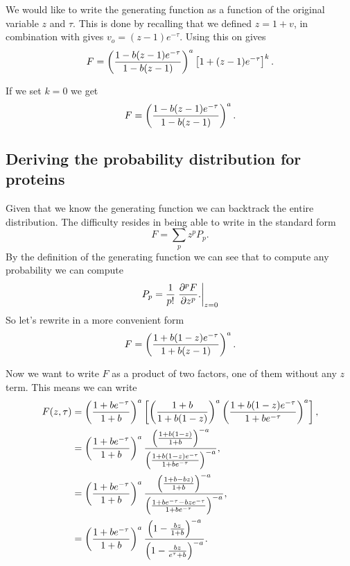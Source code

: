 We would like to write the generating function as a function of the original
variable $z$ and $\tau$. This is done by recalling that we defined $z = 1 + v$,
in combination with  gives $v_o = (z - 1) e^{-\tau}$.
Using this on  gives
\begin{equation}
  F = \left( {1 - b (z - 1) e^{-\tau}
  \over
  1 - b (z - 1)
  } \right)^a
  \left[ 1 + (z - 1) e^{-\tau} \right]^k.
\end{equation}

If we set $k = 0$ we get
\begin{equation}
  F = \left( {1 - b (z - 1) e^{-\tau}
  \over
  1 - b (z - 1)
  } \right)^a.
  \label{eq_generating_function_onz}
\end{equation}

\subsection{Deriving the probability distribution for proteins}

Given that we know the generating function we can backtrack the entire
distribution. The difficulty resides in being able to write
 in the standard form
\begin{equation}
  F = \sum_{p} z^p P_p.
\end{equation}
By the definition of the generating function we can see that to compute any
probability we can compute
\begin{equation}
  P_p = {1 \over p!} \left. {\partial ^p F \over \partial z^p}.
  \right\rvert_{z=0}
  \label{eq_prob_from_generating}
\end{equation}
So let's rewrite  in a more convenient form
\begin{equation}
  F = \left( {1 + b (1 - z) e^{-\tau}
  \over
  1 + b (z - 1)
  }  \right)^a.
\end{equation}

Now we want to write $F$ as a product of two factors, one of them without any
$z$ term. This means we can write
\begin{align}
  F(z, \tau) &= \left( {1 + b e^{-\tau} \over 1 + b } \right)^a
  \left[
  \left( {1 + b} \over 1 + b (1 - z) \right)^a
  \left( {1 + b (1 - z) e^{-\tau} \over 1 + b e^{-\tau}}  \right)^a
  \right], \\
  &= \left( {1 + b e^{-\tau} \over 1 + b } \right)^a
  { \left( {1 + b (1 - z) \over 1 + b} \right)^{-a}
  \over
  \left( {1 + b (1 - z) e^{-\tau} \over 1 + b e^{-\tau}} \right)^{-a}
  }, \\
  &= \left( {1 + b e^{-\tau} \over 1 + b } \right)^a
  { \left( {1 + b - b z) \over 1 + b} \right)^{-a}
  \over
  \left( {1 + b e^{-\tau} - b z e^{-\tau} \over 1 + b e^{-\tau}} \right)^{-a}
  }, \\
  &= \left( {1 + b e^{-\tau} \over 1 + b } \right)^a
  { \left( 1 - {b z \over 1 + b} \right)^{-a}
  \over
  \left( 1 - {b z \over e^{\tau} + b} \right)^{-a}
  }. \label{eq_generating_final}
\end{align}

